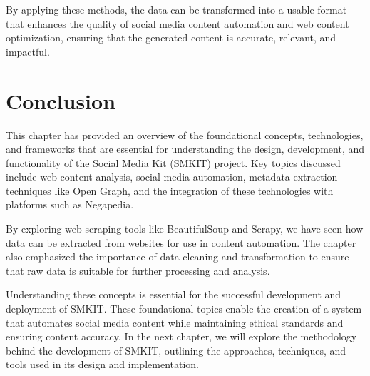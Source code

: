 By applying these methods, the data can be transformed into a usable format that enhances the quality of social media content automation and web content optimization, ensuring that the generated content is accurate, relevant, and impactful.


\section{Conclusion}
\label{sec:preliminaries_conclusion}

This chapter has provided an overview of the foundational concepts, technologies, and frameworks that are essential for understanding the design, development, and functionality of the Social Media Kit (SMKIT) project. Key topics discussed include web content analysis, social media automation, metadata extraction techniques like Open Graph, and the integration of these technologies with platforms such as Negapedia.

By exploring web scraping tools like BeautifulSoup and Scrapy, we have seen how data can be extracted from websites for use in content automation. The chapter also emphasized the importance of data cleaning and transformation to ensure that raw data is suitable for further processing and analysis.

Understanding these concepts is essential for the successful development and deployment of SMKIT. These foundational topics enable the creation of a system that automates social media content while maintaining ethical standards and ensuring content accuracy. In the next chapter, we will explore the methodology behind the development of SMKIT, outlining the approaches, techniques, and tools used in its design and implementation.

